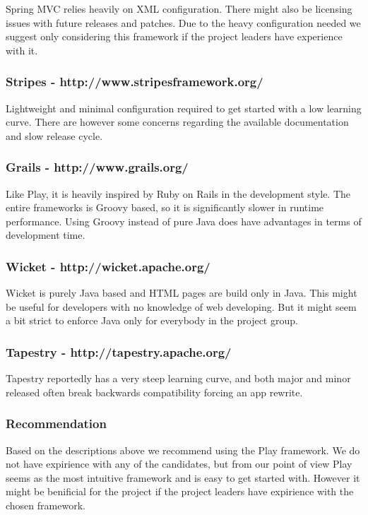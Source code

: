 \documentclass{acm_proc_article-sp}
\begin{document}
Spring MVC relies heavily on XML configuration. There might also be licensing issues with future releases and patches. Due to the heavy configuration needed we suggest only considering this framework if the project leaders have experience with it.

\subsubsection*{Stripes - http://www.stripesframework.org/}

Lightweight and minimal configuration required to get started with a low learning curve. There are however some concerns regarding the available documentation and slow release cycle.

\subsubsection*{Grails - http://www.grails.org/}

Like Play, it is heavily inspired by Ruby on Rails in the development style. The entire frameworks is Groovy based, so it is significantly slower in runtime performance. Using Groovy instead of pure Java does have advantages in terms of development time.

\subsubsection*{Wicket - http://wicket.apache.org/}

Wicket is purely Java based and HTML pages are build only in Java. This might be useful for developers with no knowledge of web developing. But it might seem a bit strict to enforce Java only for everybody in the project group.

\subsubsection*{Tapestry - http://tapestry.apache.org/}

Tapestry reportedly has a very steep learning curve, and both major and minor released often break backwards compatibility forcing an app rewrite.

\subsubsection{Recommendation}

Based on the descriptions above we recommend using the Play framework. We do not have expirience with any of the candidates, but from our point of view Play seems as the most intuitive framework and is easy to get started with. However it might be benificial for the project if the project leaders have expirience with the chosen framework.
\end{document}

